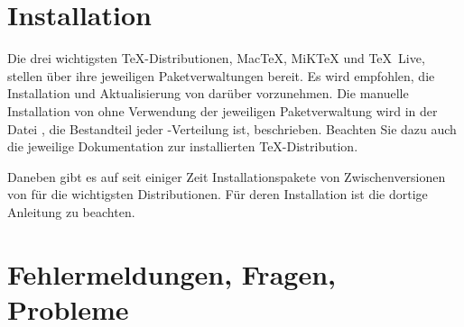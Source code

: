 \section{Installation}

Die drei wichtigsten \TeX-Distributionen, Mac\TeX, MiK\TeX{} und \TeX~Live,
stellen \KOMAScript{} über ihre jeweiligen Paketverwaltungen bereit. Es wird
empfohlen, die Installation und Aktualisierung von \KOMAScript{} darüber
vorzunehmen. Die manuelle Installation von {\KOMAScript} ohne Verwendung der
jeweiligen Paketverwaltung wird in der Datei , die
Bestandteil jeder \KOMAScript-Verteilung ist, beschrieben.  Beachten Sie dazu
auch die jeweilige Dokumentation zur installierten \TeX-Distribution.

Daneben gibt es auf \cite{homepage} seit einiger Zeit Installationspakete von
Zwischenversionen von \KOMAScript{} für die wichtigsten Distributionen. Für
deren Installation ist die dortige Anleitung zu beachten.


\section{Fehlermeldungen, Fragen, Probleme}

